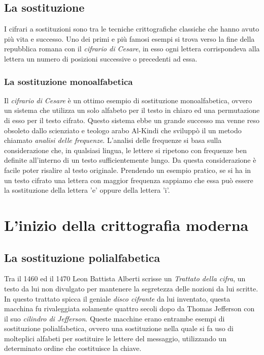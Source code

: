 \documentclass[a4paper, 12pt]{article}
\begin{document}
\subsection{La sostituzione}
I cifrari a sostituzioni sono tra le tecniche crittografiche classiche che hanno avuto più vita e successo. Uno dei primi e più famosi esempi si trova verso la fine della repubblica romana con il \textit{cifrario di Cesare}, in esso ogni lettera corrispondeva alla lettera un numero di posizioni successive o precedenti ad essa. 
\subsubsection{La sostituzione monoalfabetica}
Il \textit{cifrario di Cesare} è un ottimo esempio di sostituzione monoalfabetica, ovvero un sistema che utilizza un solo alfabeto per il testo in chiaro ed una permutazione di esso per il testo cifrato.\newline
Questo sistema ebbe un grande successo ma venne reso obsoleto dallo scienziato e teologo arabo Al-Kindi che sviluppò il un metodo chiamato \textit{analisi delle frequenze}.\newline
L'analisi delle frequenze si basa sulla considerazione che, in qualsiasi lingua, le lettere si ripetono con frequenze ben definite all'interno di un testo sufficientemente lungo. Da questa considerazione è facile poter risalire al testo originale. Prendendo un esempio pratico, se si ha in un testo cifrato una lettera con maggior frequenza sappiamo che essa può essere la sostituzione della lettera 'e' oppure della lettera 'i'.
\section{L'inizio della crittografia moderna}
\subsection{La sostituzione polialfabetica}
Tra il 1460 ed il 1470 Leon Battista Alberti scrisse un \textit{Trattato della cifra}, un testo da lui non divulgato per mantenere la segretezza delle nozioni da lui scritte. In questo trattato spicca il geniale \textit{disco cifrante} da lui inventato, questa macchina fu rivaleggiata solamente quattro secoli dopo da Thomas Jefferson con il suo \textit{cilindro di Jefferson}.
Queste macchine erano entrambe esempi di sostituzione polialfabetica, ovvero una sostituzione nella quale si fa uso di molteplici alfabeti per sostituire le lettere del messaggio, utilizzando un determinato ordine che costituisce la chiave.
\end{document}
